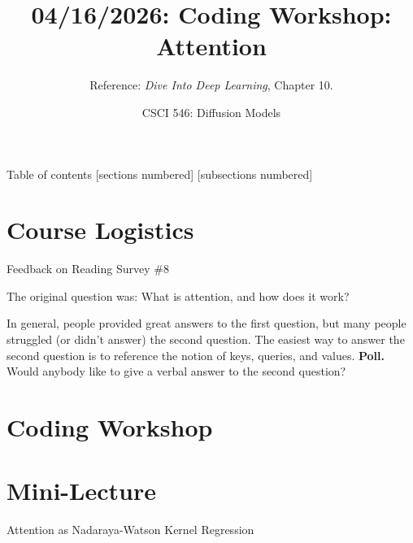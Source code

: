 \documentclass[10pt]{beamer}
\title{04/16/2026: Coding Workshop: Attention}
\author{Reference: \textit{Dive Into Deep Learning}, Chapter 10.}
\date{CSCI 546: Diffusion Models}
\begin{document}
\maketitle


\begin{frame}{Table of contents}
  [sections numbered]
  [subsections numbered]
  \tableofcontents
\end{frame}





\section{Course Logistics}




\begin{frame}{Feedback on Reading Survey \#8}

The original question was:
\alert{What is attention, and how does it work?}

\vfill 

In general, people provided great answers to the first question, but many people struggled (or didn't answer) the second question.
\pause 
\vfill 
The easiest way to answer the second question is to reference the notion of keys, queries, and values.
\pause 
\vfill 
\colorbox{yellow!30}{\textbf{Poll.}} Would anybody like to give a verbal answer to the second question?

\end{frame}






\section{Coding Workshop}



\section{Mini-Lecture}


\begin{frame}[standout]
\alert{Attention as Nadaraya-Watson Kernel Regression}
\end{frame}
\end{document}
